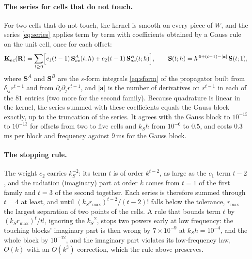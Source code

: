 \documentclass[11pt,a4paper]{article}
\newcommand{\bK}{\mathbf{K}}
\newcommand{\bR}{\mathbf{R}}
\begin{document}
\paragraph{The series for cells that do not touch.} For two cells that do not touch, the kernel is smooth
on every piece of $W$, and the series \eqref{eq:series} applies term by term with coefficients obtained by
a Gauss rule on the unit cell, once for each offset:
\begin{equation}\label{eq:farseries}
  \bK_{ac}(\bR)=\sum_{t\ge0}\Bigl[c_1(t-1)\,\mathbf{S}^A_{ac}(t;h)+c_2(t-1)\,\mathbf{S}^B_{ac}(t;h)\Bigr],
  \qquad\mathbf{S}(t;h)=h^{\,6+(t-1)-|\mathbf{a}|}\,\mathbf{S}(t;1),
\end{equation}
where $\mathbf{S}^A$ and $\mathbf{S}^B$ are the $s$-form integrals \eqref{eq:sform} of the propagator built
from $\delta_{ij}r^{t-1}$ and from $\partial_i\partial_jr^{t-1}$, and $|\mathbf{a}|$ is the number of
derivatives on $r^{t-1}$ in each of the $81$ entries (two more for the second family). Because quadrature is
linear in the kernel, the series summed with these coefficients equals the Gauss block exactly, up to the
truncation of the series. It agrees with the Gauss block to $10^{-15}$ to $10^{-13}$ for offsets from two
to five cells and $k_Sh$ from $10^{-6}$ to $0.5$, and costs $0.3$\,ms per block and frequency against
$9$\,ms for the Gauss block.

\paragraph{The stopping rule.} The weight $c_2$ carries $k_S^{-2}$: its term $t$ is of order $k^{t-2}$, as
large as the $c_1$ term $t-2$, and the radiation (imaginary) part at order $k$ comes from $t=1$ of the first
family and $t=3$ of the second together. Each series is therefore summed through $t=4$ at least, and until
$(k_Sr_{\max})^{t-2}/(t-2)!$ falls below the tolerance, $r_{\max}$ the largest separation of two points of
the cells. A rule that bounds term $t$ by $(k_Sr_{\max})^t/t!$, ignoring the $k_S^{-2}$, stops two powers
early at low frequency: the touching blocks' imaginary part is then wrong by $7\times10^{-9}$ at
$k_Sh=10^{-4}$, and the whole block by $10^{-12}$, and the imaginary part violates its low-frequency law,
$O(k)$ with an $O(k^3)$ correction, which the rule above preserves.
\end{document}
